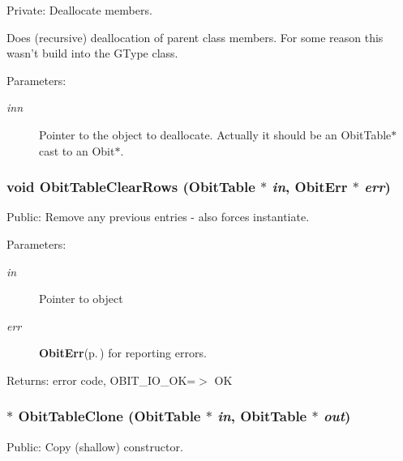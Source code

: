 Private: Deallocate members. 

Does (recursive) deallocation of parent class members. For some reason this wasn't build into the GType class. \begin{Desc}
\item[Parameters:]
\begin{description}
\item[{\em inn}]Pointer to the object to deallocate. Actually it should be an Obit\-Table$\ast$ cast to an Obit$\ast$. \end{description}
\end{Desc}
\subsubsection{\setlength{\rightskip}{0pt plus 5cm}void Obit\-Table\-Clear\-Rows ({\bf Obit\-Table} $\ast$ {\em in}, {\bf Obit\-Err} $\ast$ {\em err})}\label{ObitTable_8c_a25}


Public: Remove any previous entries - also forces instantiate. 

\begin{Desc}
\item[Parameters:]
\begin{description}
\item[{\em in}]Pointer to object \item[{\em err}]{\bf Obit\-Err}{\rm (p.\,\pageref{structObitErr})} for reporting errors. \end{description}
\end{Desc}
\begin{Desc}
\item[Returns:]error code, OBIT\_\-IO\_\-OK=$>$ OK \end{Desc}
\subsubsection{$\ast$ Obit\-Table\-Clone ({\bf Obit\-Table} $\ast$ {\em in}, {\bf Obit\-Table} $\ast$ {\em out})}\label{ObitTable_8c_a20}


Public: Copy (shallow) constructor. 

